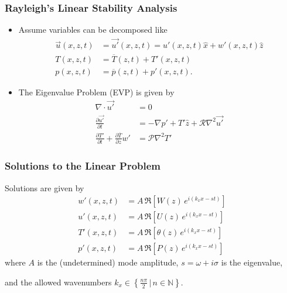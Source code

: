 \section{}
\begin{frame}[fragile]
    \frametitle{Rayleigh's Linear Stability Analysis}
    \begin{itemize}
        \item Assume variables can be decomposed like 
        \begin{align}
            \vec{u}(x, z, t) &= \vec{u'}(x, z, t) \label{EQ:reynolds_dc_u} = u'(x, z, t)\hat{x} + w'(x, z, t)\hat{z} \\
            T(x, z, t) &= \overline{T}(z, t) + T'(x, z, t) \label{EQ:reynolds_dc_T}\\
            p(x, z, t) &= \overline{p}(z, t) +  p'(x, z, t). \label{EQ:reynolds_dc_p}
        \end{align}
        \item The Eigenvalue Problem (EVP) is given by
        \begin{align}
            \nabla \cdot \vec{u'} &= 0 \label{EQ:linear1}\\
            \frac{\partial\vec{u'}}{\partial t} &= - \nabla p' + T'\hat{z} + \mathcal{R} \nabla^2 \vec{u'} \label{EQ:linear2}\\
            \frac{\partial T'}{\partial t} + \frac{\partial \overline{T}}{\partial z} w' &= \mathcal{P} \nabla^2 T' \label{EQ:linear3}
        \end{align}
    \end{itemize}
    
\end{frame}

\begin{frame}[fragile]
    \frametitle{Solutions to the Linear Problem}
        Solutions are given by
        \begin{align}
            w'(x, z, t) &= A\, \Re\left[W(z) \, e^{i(k_xx-st)}\right] \label{EQ:normal_modes1}\\ 
            u'(x, z, t) &= A\, \Re\left[U(z) \, e^{i(k_xx-st)}\right] \label{EQ:normal_modes2}\\ 
            T'(x, z, t) &= A\, \Re\left[\theta(z) \, e^{i(k_xx-st)}\right] \label{EQ:normal_modes3}\\ 
            p'(x, z, t) &= A\, \Re\left[P(z) \, e^{i(k_xx-st)}\right] \label{EQ:normal_modes4}
        \end{align}
        where $A$ is the (undetermined) mode amplitude, $s = \omega + i\sigma$ is the eigenvalue, \newline
        
        and the allowed wavenumbers $k_x \in \left\{\frac{n\pi}{2} \, \big| \, n \in \mathbb{N}\right\}$.
    
\end{frame}

